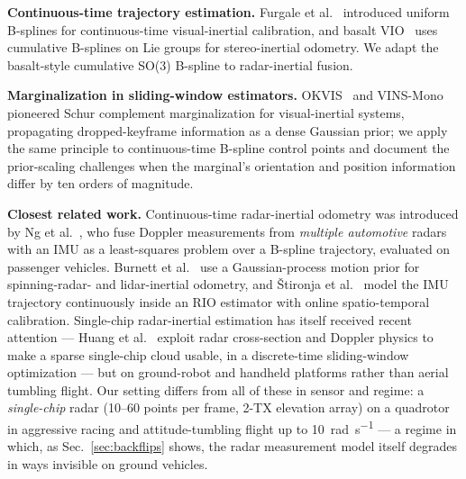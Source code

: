 \documentclass[conference]{IEEEtran}
\begin{document}
\textbf{Continuous-time trajectory estimation.}
Furgale et al.~\cite{furgale2013unified} introduced uniform B-splines
for continuous-time visual-inertial calibration, and basalt
VIO~\cite{usenko2020basalt} uses cumulative B-splines on Lie groups for
stereo-inertial odometry.  We
adapt the basalt-style cumulative SO(3) B-spline to radar-inertial fusion.

\textbf{Marginalization in sliding-window estimators.}
OKVIS~\cite{leutenegger2015keyframe} and VINS-Mono~\cite{qin2018vins}
pioneered Schur complement marginalization for visual-inertial systems,
propagating dropped-keyframe information as a dense Gaussian prior; we
apply the same principle to continuous-time B-spline control points and
document the prior-scaling challenges when the marginal's orientation
and position information differ by ten orders of magnitude.

\textbf{Closest related work.}
Continuous-time radar-inertial odometry was introduced by
Ng et al.~\cite{ng2021ctrio}, who fuse Doppler measurements from
\emph{multiple automotive} radars with an IMU as a least-squares
problem over a B-spline trajectory, evaluated on passenger vehicles.
Burnett et al.~\cite{burnett2024gp} use a Gaussian-process motion
prior for spinning-radar- and lidar-inertial odometry, and
\v{S}tironja et al.~\cite{stironja2026rio} model the IMU trajectory
continuously inside an RIO estimator with online spatio-temporal
calibration.  Single-chip radar-inertial estimation has itself
received recent attention --- Huang et al.~\cite{huang2024lessismore}
exploit radar cross-section and Doppler physics to make a sparse
single-chip cloud usable, in a discrete-time sliding-window
optimization --- but on ground-robot and handheld platforms rather
than aerial tumbling flight.
Our setting differs from all of these in sensor and
regime: a \emph{single-chip} radar (10--60 points per frame,
2-TX elevation array) on a quadrotor in aggressive racing and
attitude-tumbling flight up to \SI{10}{\radian\per\second} --- a
regime in which, as Sec.~\ref{sec:backflips} shows, the radar
measurement model itself degrades in ways invisible on ground
vehicles.
\end{document}
